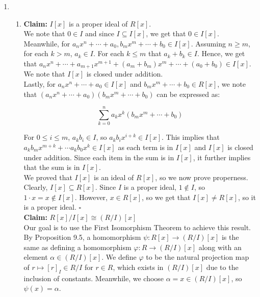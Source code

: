 \documentclass{article}
\begin{document}
\begin{enumerate}

\item 
\begin{enumerate}
    \item 
    \textbf{Claim: } $I[x]$ is a proper ideal of $R[x]$. \\

    We note that $0 \in I$ and since $I \subseteq I[x]$, we get that $0 \in I[x]$. \\

    Meanwhile, for $a_nx^n + \cdots + a_0, b_mx^m + \cdots + b_0 \in I[x]$. Assuming $n \geq m$, for each $k > m$, $a_k \in I$. For each $k \leq m$ that $a_k + b_k \in I$. Hence, we get that $a_nx^n + \cdots + a_{m+1}x^{m+1} + (a_m + b_m)x^m + \cdots + (a_0 + b_0) \in I[x]$. We note that $I[x]$ is closed under addition.\\

    Lastly, for $a_nx^n + \cdots + a_0 \in I[x]$ and $b_mx^m + \cdots + b_0 \in R[x]$, we note that $(a_nx^n + \cdots + a_0) (b_mx^m + \cdots + b_0)$ can be expressed as: 

    $$\sum^n_{k=0}a_kx^k(b_mx^m + \cdots + b_0)$$

    For $0 \leq i \leq m$, $a_kb_i \in I$, so $a_kb_ix^{i+k} \in I[x]$. This implies that $a_kb_mx^{m+k} + \cdots a_kb_0x^k \in I[x]$ as each term is in $I[x]$ and $I[x]$ is closed under addition. Since each item in the sum is in $I[x]$, it further implies that the sum is in $I[x]$. \\

    We proved that $I[x]$ is an ideal of $R[x]$, so we now prove properness. Clearly, $I[x] \subseteq R[x]$. Since $I$ is a proper ideal, $1 \not \in I$, so $1 \cdot x = x \notin I[x]$. However, $x \in R[x]$, so we get that $I[x] \neq R[x]$, so it is a proper ideal. \hfill $\square$  \\

    \textbf{Claim:} $R[x]/I[x] \cong (R/I)[x]$ \\

    Our goal is to use the First Isomorphism Theorem to achieve this result. \\ 

    By Proposition 9.5, a homomorphism $\psi: R[x] \rightarrow (R/I)[x]$ is the same as defining a homomorphism $\varphi: R \rightarrow (R/I)[x]$ along with an element $\alpha \in (R/I)[x]$. We define $\varphi$ to be the natural projection map of $r \mapsto [r]_I \in R/I$ for $r \in R$, which exists in $(R/I)[x]$ due to the inclusion of constants. Meanwhile, we choose $\alpha = x \in (R/I)[x]$, so $\psi(x) = \alpha$. \\


\end{enumerate}
\end{enumerate}
\end{document}
